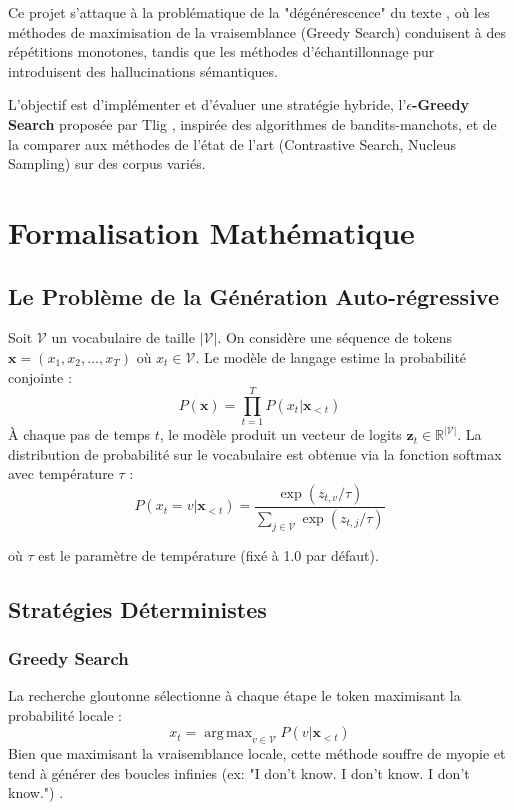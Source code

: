 \documentclass[12pt,a4paper]{article}
\newcommand{\vocab}{\mathcal{V}}
\DeclareMathOperator*{\argmax}{arg\,max}
\begin{document}
Ce projet s'attaque \`a la probl\'ematique de la "d\'eg\'en\'erescence" du texte \cite{holtzman2019curious}, o\`u les m\'ethodes de maximisation de la vraisemblance (Greedy Search) conduisent \`a des r\'ep\'etitions monotones, tandis que les m\'ethodes d'\'echantillonnage pur introduisent des hallucinations s\'emantiques.

L'objectif est d'impl\'ementer et d'\'evaluer une strat\'egie hybride, l'\textbf{$\epsilon$-Greedy Search} propos\'ee par Tlig \cite{tlig2025epsilon}, inspir\'ee des algorithmes de bandits-manchots, et de la comparer aux m\'ethodes de l'\'etat de l'art (Contrastive Search, Nucleus Sampling) sur des corpus vari\'es.

\section{Formalisation Math\'ematique}

\subsection{Le Probl\`eme de la G\'en\'eration Auto-r\'egressive}
Soit $\vocab$ un vocabulaire de taille $|\vocab|$. On consid\`ere une s\'equence de tokens $\mathbf{x} = (x_1, x_2, \dots, x_T)$ o\`u $x_t \in \vocab$. Le mod\`ele de langage estime la probabilit\'e conjointe :
\begin{equation}
    P(\mathbf{x}) = \prod_{t=1}^{T} P(x_t | \mathbf{x}_{<t})
\end{equation}
\`A chaque pas de temps $t$, le mod\`ele produit un vecteur de logits $\mathbf{z}_t \in \mathbb{R}^{|\vocab|}$. La distribution de probabilit\'e sur le vocabulaire est obtenue via la fonction softmax avec temp\'erature $\tau$ :
\begin{equation}
    P(x_t = v | \mathbf{x}_{<t}) = \frac{\exp(z_{t,v} / \tau)}{\sum_{j \in \vocab} \exp(z_{t,j} / \tau)}
\end{equation}

où $\tau$ est le paramètre de température (fixé à 1.0 par défaut).

\subsection{Stratégies Déterministes}
\subsubsection{Greedy Search}
La recherche gloutonne sélectionne à chaque étape le token maximisant la probabilité locale :
\begin{equation}
    x_t = \argmax_{v \in \vocab} P(v | \mathbf{x}_{<t})
\end{equation}
Bien que maximisant la vraisemblance locale, cette méthode souffre de myopie et tend à générer des boucles infinies (ex: "I don't know. I don't know. I don't know.") \cite{li2016deep}.
\end{document}
